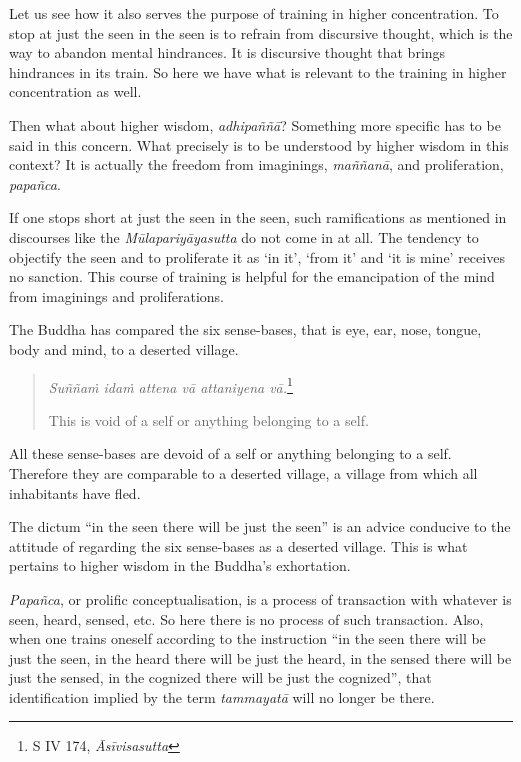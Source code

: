 Let us see how it also serves the purpose of training in higher concentration. To stop at just the seen in the seen is to refrain from discursive thought, which is the way to abandon mental hindrances. It is discursive thought that brings hindrances in its train. So here we have what is relevant to the training in higher concentration as well.

Then what about higher wisdom, \emph{adhipaññā}? Something more specific has to be said in this concern. What precisely is to be understood by higher wisdom in this context? It is actually the freedom from imaginings, \emph{maññanā}, and proliferation, \emph{papañca}.

If one stops short at just the seen in the seen, such ramifications as mentioned in discourses like the \emph{Mūlapariyāyasutta} do not come in at all. The tendency to objectify the seen and to proliferate it as `in it', `from it' and `it is mine' receives no sanction. This course of training is helpful for the emancipation of the mind from imaginings and proliferations.

The Buddha has compared the six sense-bases, that is eye, ear, nose, tongue, body and mind, to a deserted village.

\begin{quote}
\emph{Suññaṁ idaṁ attena vā attaniyena vā.}\footnote{S IV 174, \emph{Āsīvisasutta}}

This is void of a self or anything belonging to a self.
\end{quote}

All these sense-bases are devoid of a self or anything belonging to a self. Therefore they are comparable to a deserted village, a village from which all inhabitants have fled.

The dictum ``in the seen there will be just the seen'' is an advice conducive to the attitude of regarding the six sense-bases as a deserted village. This is what pertains to higher wisdom in the Buddha's exhortation.

\emph{Papañca}, or prolific conceptualisation, is a process of transaction with whatever is seen, heard, sensed, etc. So here there is no process of such transaction. Also, when one trains oneself according to the instruction ``in the seen there will be just the seen, in the heard there will be just the heard, in the sensed there will be just the sensed, in the cognized there will be just the cognized'', that identification implied by the term \emph{tammayatā} will no longer be there.


